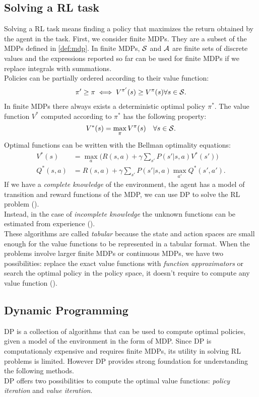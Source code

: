 \subsection{Solving a \ac{RL} task}\label{subsec:solv}
Solving a \ac{RL} task means finding a policy that maximizes the return obtained by the agent in the task. First, we consider finite \ac{MDPs}. They are a subset of the \ac{MDPs} defined in \ref{def:mdp}. In finite \ac{MDPs}, $\mathcal{S}$ and $\mathcal{A}$ are finite sets of discrete values and the expressions reported so far can be used for finite \ac{MDPs} if we replace integrals with summations.\\
Policies can be partially ordered according to their value function: 
\begin{align}
\pi' \geq \pi \iff V^{\pi'}(s) \geq V^{\pi}(s) \forall s \in \mathcal{S}. \label{eq:ordpol}
\end{align} 
In finite \ac{MDPs} there always exists a deterministic optimal policy $\pi^{*}$. The value function $V^{*}$ computed according to $\pi^{*}$ has the following property:
$$ V^{*}(s) = \max_{\pi}V^{\pi}(s) \quad \forall s \in \mathcal{S}.$$
Optimal functions can be written with the Bellman optimality equations:
\begin{align*}
V^{*}(s) &= \max_a \Big( R(s,a) + \gamma \sum_{s'}P(s'|s,a)   V^{*}(s') \Big)\\
Q^{*}(s,a) &= R(s,a) + \gamma \sum_{s'}P(s'|s,a) \max_{a'} Q^{*}(s', a').
\end{align*}
If we have a \emph{complete knowledge} of the environment, \ie the agent has a model of transition and reward functions of the \ac{MDP}, we can use \acf{DP} to solve the \ac{RL} problem ().\\
Instead, in the case of \emph{incomplete knowledge} the unknown functions can be estimated from experience ().\\
\newline
These algorithms are called \emph{tabular} because the state and action spaces are small enough for the value functions to be represented in a tabular format. When the problems involve larger finite \ac{MDPs} or continuous \ac{MDPs}, we have two possibilities: replace the exact value functions with \emph{function approximators} or search the optimal policy in the policy space, it doesn't require to compute any value function ().

\subsection{Dynamic Programming}\label{subsec:dp}
\acf{DP} is a collection of algorithms that can be used to compute optimal policies, given a model of the environment in the form of \ac{MDP}. Since \ac{DP} is computationaly expensive and requires finite \ac{MDP}s, its utility in solving \ac{RL} problems is limited. However \ac{DP} provides strong foundation for understanding the following methods.\\
\newline
\ac{DP} offers two possibilities to compute the optimal value functions: \emph{policy iteration} and \emph{value iteration}.

